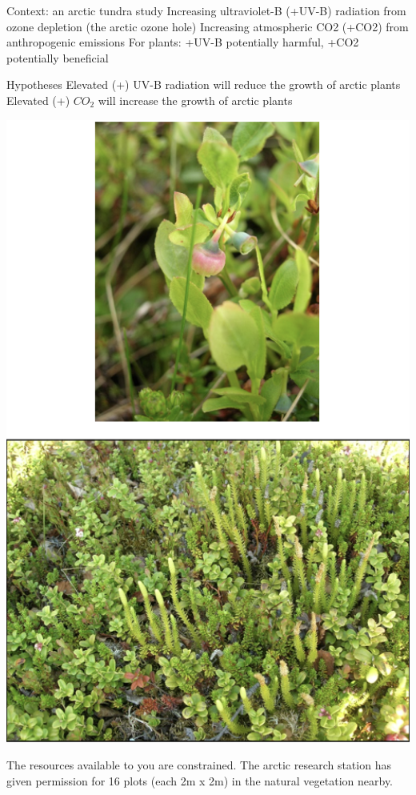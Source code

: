 \documentclass[
]{book}
\begin{document}
Context: an arctic tundra study
Increasing ultraviolet-B (+UV-B) radiation from ozone depletion (the arctic ozone hole)
Increasing atmospheric CO2 (+CO2) from anthropogenic emissions
For plants: +UV-B potentially harmful, +CO2 potentially beneficial

Hypotheses
Elevated (+) UV-B radiation will reduce the growth of arctic plants
Elevated (+) \(CO_{2}\) will increase the growth of arctic plants

\includegraphics[width=6.69in]{images/ArcticPlants}

The resources available to you are constrained. The arctic research station has given permission for 16 plots (each 2m x 2m) in the natural vegetation nearby.
\end{document}
